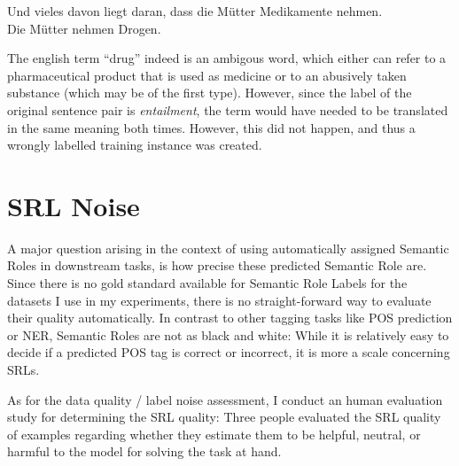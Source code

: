 {\begin{examples}
  \item Und vieles davon liegt daran, dass die Mütter Medikamente nehmen.\\
        Die Mütter nehmen Drogen.
\end{examples}

The english term ``drug'' indeed is an ambigous word, which either can refer to a pharmaceutical
product that is used as medicine or to an abusively taken substance (which may be of the first
type). However, since
the label of the original sentence pair is \emph{entailment}, the term would have needed
to be translated in the same meaning both times. However, this did not happen, and thus
a wrongly labelled training instance was created.



\section{SRL Noise}
\label{sec:srl-noise}

A major question arising in the context of using automatically assigned Semantic Roles in
downstream tasks, is how precise these predicted Semantic Role are. Since there is no gold standard
available for Semantic Role Labels for the datasets I use in my experiments, there is no
straight-forward way to evaluate their quality {\color{red} automatically}. In contrast to
other tagging tasks like POS prediction or NER, Semantic Roles are not as black and white:
While it is relatively easy to decide if a predicted POS tag is correct or incorrect, it
{\color{red} is more a scale} concerning SRLs.

As for the data quality / label noise assessment, I conduct an human evaluation study
for determining the SRL quality: Three people evaluated the SRL quality of examples regarding
whether they estimate them to be helpful, neutral, or harmful to the model for solving
the task at hand.


}
